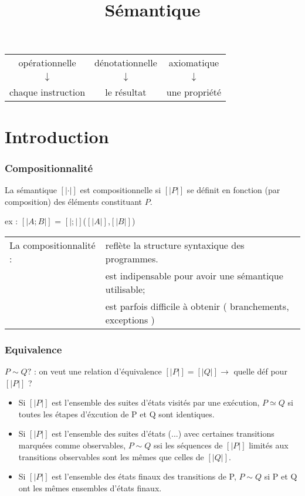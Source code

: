 \documentclass[10pt,a4paper]{article}
\title{Sémantique}
\date{}
\newcommand{\sem}[1]{$\left[| #1 | \right]$}
\newcommand{\semm}[1]{\left[| #1 | \right]}
\begin{document}
\makeatletter
{}
\makeatother

\maketitle


\begin{center}
\begin{tabular}{c c c}
opérationnelle & dénotationnelle & axiomatique \\
$\downarrow$ &  $\downarrow$ &  $\downarrow$ \\
chaque instruction & le résultat & une propriété \\
\end{tabular}
\end{center}



\part{Introduction}
\section{Compositionnalité}

\begin{definition}[Compositionnalité]
 La sémantique \sem{\cdot} est compositionnelle si \sem{P} se définit en fonction (par composition) des éléments constituant $P$.
\end{definition}

ex : \sem{A;B} = \sem{;}(\sem{A},\sem{B})\\

\begin{tabular}{l l}
La compositionnalité : & reflète la structure syntaxique des programmes.\\
& est indipensable pour avoir une sémantique utilisable;\\
& est parfois difficile à obtenir ( branchements, exceptions )
\end{tabular}


\section{Equivalence}
$P \sim Q ?$ : on veut une relation d'équivalence
$\semm{P} = \semm{Q} \rightarrow$ quelle déf pour \sem{P} ?\\
\begin{itemize}
\item Si \sem{P} est l'ensemble des suites d'états visités par une exécution, $P \simeq Q$ si toutes les étapes d'éxcution de P et Q sont identiques.
\item Si \sem{P} est l'ensemble des suites d'états (...) avec certaines transitions marquées comme observables, $P \sim Q$ ssi les séquences de \sem{P} limités aux transitions observables sont les mêmes que celles de \sem{Q}.
\item Si \sem{P} est l'ensemble des états finaux des transitions de P, $P \sim Q$ si P et Q ont les mêmes ensembles d'états finaux.
\end{itemize}
\end{document}
